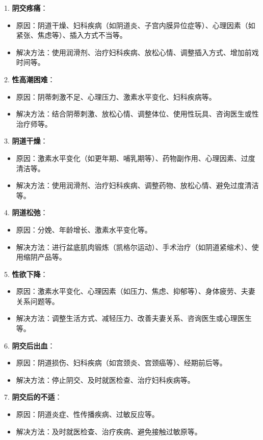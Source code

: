 \documentclass[12pt,UTF8]{ctexbook}
\begin{document}
1. \textbf{阴交疼痛}：
\begin{itemize}
	\item 原因：阴道干燥、妇科疾病（如阴道炎、子宫内膜异位症等）、心理因素（如紧张、焦虑等）、插入方式不当等。
	\item 解决方法：使用润滑剂、治疗妇科疾病、放松心情、调整插入方式、增加前戏时间等。
\end{itemize}

2. \textbf{性高潮困难}：
\begin{itemize}
	\item 原因：阴蒂刺激不足、心理压力、激素水平变化、妇科疾病等。
	\item 解决方法：结合阴蒂刺激、放松心情、调整体位、使用性玩具、咨询医生或性治疗师等。
\end{itemize}

3. \textbf{阴道干燥}：
\begin{itemize}
	\item 原因：激素水平变化（如更年期、哺乳期等）、药物副作用、心理因素、过度清洁等。
	\item 解决方法：使用润滑剂、治疗妇科疾病、调整药物、放松心情、避免过度清洁等。
\end{itemize}

4. \textbf{阴道松弛}：
\begin{itemize}
	\item 原因：分娩、年龄增长、激素水平变化等。
	\item 解决方法：进行盆底肌肉锻炼（凯格尔运动）、手术治疗（如阴道紧缩术）、使用缩阴产品等。
\end{itemize}

5. \textbf{性欲下降}：
\begin{itemize}
	\item 原因：激素水平变化、心理因素（如压力、焦虑、抑郁等）、身体疲劳、夫妻关系问题等。
	\item 解决方法：调整生活方式、减轻压力、改善夫妻关系、咨询医生或心理医生等。
\end{itemize}

6. \textbf{阴交后出血}：
\begin{itemize}
	\item 原因：阴道损伤、妇科疾病（如宫颈炎、宫颈癌等）、经期前后等。
	\item 解决方法：停止阴交、及时就医检查、治疗妇科疾病等。
\end{itemize}

7. \textbf{阴交后的不适}：
\begin{itemize}
	\item 原因：阴道炎症、性传播疾病、过敏反应等。
	\item 解决方法：及时就医检查、治疗疾病、避免接触过敏原等。
\end{itemize}
\end{document}

